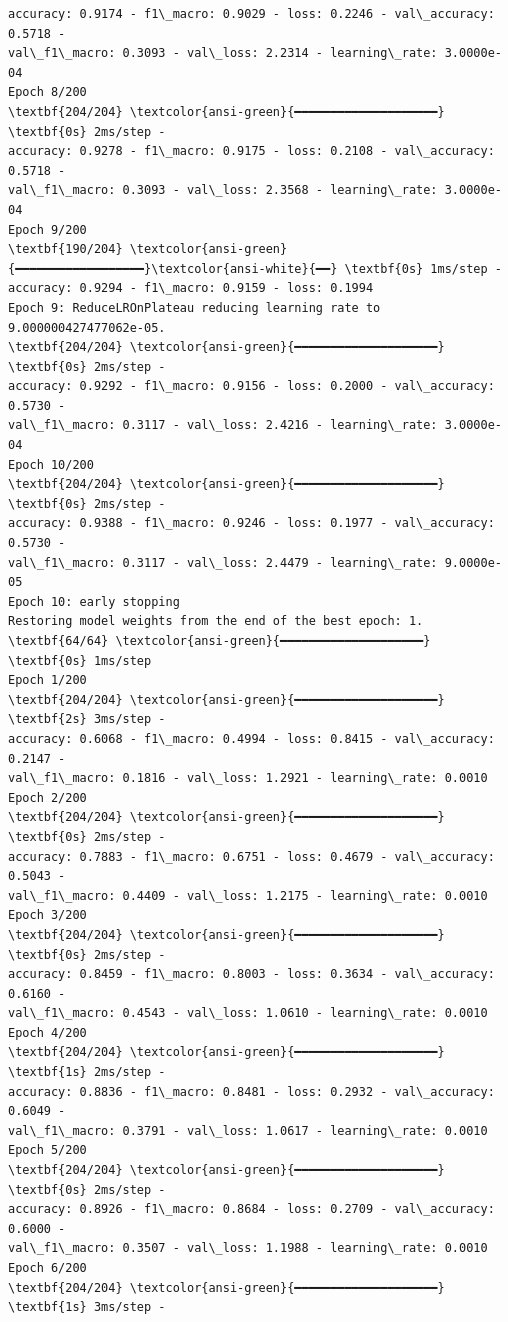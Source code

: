 \documentclass[11pt]{article}
\begin{document}
\begin{Verbatim}[commandchars=\\\{\}]
accuracy: 0.9174 - f1\_macro: 0.9029 - loss: 0.2246 - val\_accuracy: 0.5718 -
val\_f1\_macro: 0.3093 - val\_loss: 2.2314 - learning\_rate: 3.0000e-04
Epoch 8/200
\textbf{204/204} \textcolor{ansi-green}{━━━━━━━━━━━━━━━━━━━━} \textbf{0s} 2ms/step -
accuracy: 0.9278 - f1\_macro: 0.9175 - loss: 0.2108 - val\_accuracy: 0.5718 -
val\_f1\_macro: 0.3093 - val\_loss: 2.3568 - learning\_rate: 3.0000e-04
Epoch 9/200
\textbf{190/204} \textcolor{ansi-green}{━━━━━━━━━━━━━━━━━━}\textcolor{ansi-white}{━━} \textbf{0s} 1ms/step -
accuracy: 0.9294 - f1\_macro: 0.9159 - loss: 0.1994
Epoch 9: ReduceLROnPlateau reducing learning rate to 9.000000427477062e-05.
\textbf{204/204} \textcolor{ansi-green}{━━━━━━━━━━━━━━━━━━━━} \textbf{0s} 2ms/step -
accuracy: 0.9292 - f1\_macro: 0.9156 - loss: 0.2000 - val\_accuracy: 0.5730 -
val\_f1\_macro: 0.3117 - val\_loss: 2.4216 - learning\_rate: 3.0000e-04
Epoch 10/200
\textbf{204/204} \textcolor{ansi-green}{━━━━━━━━━━━━━━━━━━━━} \textbf{0s} 2ms/step -
accuracy: 0.9388 - f1\_macro: 0.9246 - loss: 0.1977 - val\_accuracy: 0.5730 -
val\_f1\_macro: 0.3117 - val\_loss: 2.4479 - learning\_rate: 9.0000e-05
Epoch 10: early stopping
Restoring model weights from the end of the best epoch: 1.
\textbf{64/64} \textcolor{ansi-green}{━━━━━━━━━━━━━━━━━━━━} \textbf{0s} 1ms/step
Epoch 1/200
\textbf{204/204} \textcolor{ansi-green}{━━━━━━━━━━━━━━━━━━━━} \textbf{2s} 3ms/step -
accuracy: 0.6068 - f1\_macro: 0.4994 - loss: 0.8415 - val\_accuracy: 0.2147 -
val\_f1\_macro: 0.1816 - val\_loss: 1.2921 - learning\_rate: 0.0010
Epoch 2/200
\textbf{204/204} \textcolor{ansi-green}{━━━━━━━━━━━━━━━━━━━━} \textbf{0s} 2ms/step -
accuracy: 0.7883 - f1\_macro: 0.6751 - loss: 0.4679 - val\_accuracy: 0.5043 -
val\_f1\_macro: 0.4409 - val\_loss: 1.2175 - learning\_rate: 0.0010
Epoch 3/200
\textbf{204/204} \textcolor{ansi-green}{━━━━━━━━━━━━━━━━━━━━} \textbf{0s} 2ms/step -
accuracy: 0.8459 - f1\_macro: 0.8003 - loss: 0.3634 - val\_accuracy: 0.6160 -
val\_f1\_macro: 0.4543 - val\_loss: 1.0610 - learning\_rate: 0.0010
Epoch 4/200
\textbf{204/204} \textcolor{ansi-green}{━━━━━━━━━━━━━━━━━━━━} \textbf{1s} 2ms/step -
accuracy: 0.8836 - f1\_macro: 0.8481 - loss: 0.2932 - val\_accuracy: 0.6049 -
val\_f1\_macro: 0.3791 - val\_loss: 1.0617 - learning\_rate: 0.0010
Epoch 5/200
\textbf{204/204} \textcolor{ansi-green}{━━━━━━━━━━━━━━━━━━━━} \textbf{0s} 2ms/step -
accuracy: 0.8926 - f1\_macro: 0.8684 - loss: 0.2709 - val\_accuracy: 0.6000 -
val\_f1\_macro: 0.3507 - val\_loss: 1.1988 - learning\_rate: 0.0010
Epoch 6/200
\textbf{204/204} \textcolor{ansi-green}{━━━━━━━━━━━━━━━━━━━━} \textbf{1s} 3ms/step -

\end{Verbatim}
\end{document}
